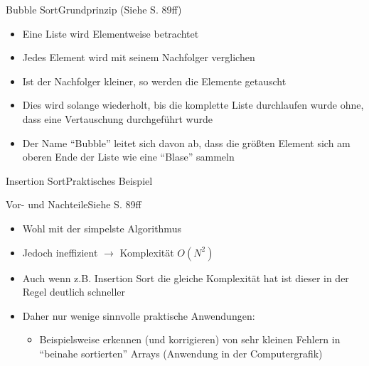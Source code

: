 \begin{frame}{Bubble Sort}{Grundprinzip (Siehe \cite{ottmann2017} S. 89ff)}
    \begin{itemize}
        \item Eine Liste wird Elementweise betrachtet
        \item Jedes Element wird mit seinem Nachfolger verglichen
        \item Ist der Nachfolger kleiner, so werden die Elemente getauscht
        \item Dies wird solange wiederholt, bis die komplette Liste durchlaufen wurde ohne, dass eine Vertauschung durchgeführt wurde
        \item Der Name "`Bubble"' leitet sich davon ab, dass die größten Element sich am oberen Ende der Liste wie eine "`Blase"' sammeln
    \end{itemize}
\end{frame}

\begin{frame}{Insertion Sort}{Praktisches Beispiel}
\end{frame}

\begin{frame}{Vor- und Nachteile}{Siehe \cite{ottmann2017} S. 89ff}
    \begin{itemize}
        \item Wohl mit der simpelste Algorithmus
        \item Jedoch ineffizient $\rightarrow$ Komplexität $O(N^2)$
        \item Auch wenn z.B. Insertion Sort die gleiche Komplexität hat ist dieser in der Regel deutlich schneller
        \item Daher nur wenige sinnvolle praktische Anwendungen:
        \begin{itemize}
            \item Beispielsweise erkennen (und korrigieren) von sehr kleinen Fehlern in "`beinahe sortierten"' Arrays (Anwendung in der Computergrafik)
        \end{itemize}
    \end{itemize}
\end{frame}
